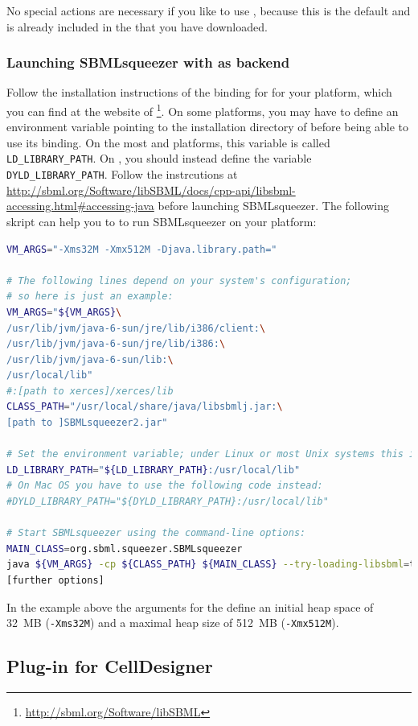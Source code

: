 No special actions are necessary if you like to use \JSBML, because this is the
default and \JSBML is already included in the \JAR that you have downloaded.

\subsubsection{Launching SBMLsqueezer with \libSBML as backend}

Follow the installation instructions of the \Java binding for \libSBML for your
platform, which you can find at the website of
\libSBML\footnote{\url{http://sbml.org/Software/libSBML}}.
On some platforms, you may have to define an environment variable pointing
to the installation directory of \libSBML before being able to use its \Java
binding.
On the most \Unix and \Linux platforms, this variable is called
\texttt{LD\_LIBRARY\_PATH}.
On \MacOSX, you should instead define the variable \texttt{DYLD\_LIBRARY\_PATH}.
Follow the instrcutions at \url{http://sbml.org/Software/libSBML/docs/cpp-api/libsbml-accessing.html#accessing-java}
before launching SBMLsqueezer.
The following skript can help you to to run SBMLsqueezer on your \Unix platform:
\begin{lstlisting}[language=bash]
VM_ARGS="-Xms32M -Xmx512M -Djava.library.path="

# The following lines depend on your system's configuration; 
# so here is just an example:
VM_ARGS="${VM_ARGS}\
/usr/lib/jvm/java-6-sun/jre/lib/i386/client:\
/usr/lib/jvm/java-6-sun/jre/lib/i386:\
/usr/lib/jvm/java-6-sun/lib:\
/usr/local/lib"
#:[path to xerces]/xerces/lib
CLASS_PATH="/usr/local/share/java/libsbmlj.jar:\
[path to ]SBMLsqueezer2.jar"

# Set the environment variable; under Linux or most Unix systems this is
LD_LIBRARY_PATH="${LD_LIBRARY_PATH}:/usr/local/lib"
# On Mac OS you have to use the following code instead:
#DYLD_LIBRARY_PATH="${DYLD_LIBRARY_PATH}:/usr/local/lib"

# Start SBMLsqueezer using the command-line options:
MAIN_CLASS=org.sbml.squeezer.SBMLsqueezer 
java ${VM_ARGS} -cp ${CLASS_PATH} ${MAIN_CLASS} --try-loading-libsbml=true\
[further options]
\end{lstlisting}
In the example above the arguments for the \JVM define an initial heap space of
32~MB (\texttt{-Xms32M}) and a maximal heap size of 512~MB (\texttt{-Xmx512M}).

\subsection{Plug-in for CellDesigner}




